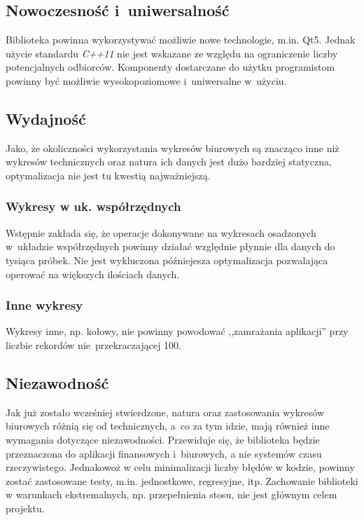 \documentclass[11pt,twoside,a4paper,final]{article}
\begin{document}
\subsection{Nowoczesność i~uniwersalność}
Biblioteka powinna wykorzystywać możliwie nowe technologie, m.in. Qt5. Jednak użycie standardu \textit{C++11} nie jest wskazane ze względu na ograniczenie liczby potencjalnych odbiorców. Komponenty dostarczane do użytku programistom powinny być możliwie wysokopoziomowe i~uniwersalne w~użyciu.

\subsection{Wydajność}
Jako, że okoliczności wykorzystania wykresów biurowych są znacząco inne niż wykresów technicznych oraz natura ich danych jest dużo bardziej statyczna, optymalizacja nie jest tu kwestią najważniejszą. 

\subsubsection{Wykresy w uk. współrzędnych}
Wstępnie zakłada się, że operacje dokonywane na wykresach osadzonych w~układzie współrzędnych powinny działać względnie płynnie dla danych do tysiąca próbek. Nie jest wykluczona późniejesza optymalizacja
pozwalająca operować na większych ilościach danych.

\subsubsection{Inne wykresy}
Wykresy inne, np. kołowy, nie powinny powodować ,,zamrażania aplikacji'' przy liczbie rekordów nie~przekraczającej 100. 

\subsection{Niezawodność}
Jak już zostało wcześniej stwierdzone, natura oraz zastosowania wykresów biurowych różnią się od technicznych, a~co za tym idzie, mają również inne wymagania dotyczące niezawodności. Przewiduje się, że biblioteka będzie przeznaczona do aplikacji finansowych i~biurowych, a nie systemów czasu rzeczywistego. Jednakowoż w celu minimalizacji liczby błędów w kodzie, powinny zostać zastosowane testy, m.in. jednostkowe, regresyjne, itp. Zachowanie biblioteki w warunkach ekstremalnych, np. przepełnienia stosu, nie jest głównym celem projektu.

\end{document}
